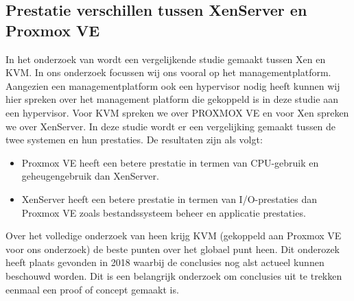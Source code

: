 \subsection{Prestatie verschillen tussen XenServer en Proxmox VE}
In het onderzoek van \textcite{algarni2018performance} wordt een vergelijkende studie gemaakt tussen Xen en KVM. In ons onderzoek focussen wij ons vooral op het managementplatform.
Aangezien een managementplatform ook een hypervisor nodig heeft kunnen wij hier spreken over het management platform die gekoppeld is in deze studie aan een hypervisor.
Voor KVM spreken we over PROXMOX VE en voor Xen spreken we over XenServer. In deze studie wordt er een vergelijking gemaakt tussen de twee systemen en hun prestaties. De resultaten zijn als volgt:
\begin{itemize}
    \item Proxmox VE heeft een betere prestatie in termen van CPU-gebruik en geheugengebruik dan XenServer.
    \item XenServer heeft een betere prestatie in termen van I/O-prestaties dan Proxmox VE zoals bestandssysteem beheer en applicatie prestaties.
\end{itemize}                               
Over het volledige onderzoek van \textcite{algarni2018performance} heen krijg KVM (gekoppeld aan Proxmox VE voor ons onderzoek) de beste punten over het globael punt heen. Dit onderozek heeft plaats gevonden in 2018 waarbij de conclusies nog alst actueel kunnen beschouwd worden.
Dit is een belangrijk onderzoek om conclusies uit te trekken eenmaal een proof of concept gemaakt is.

